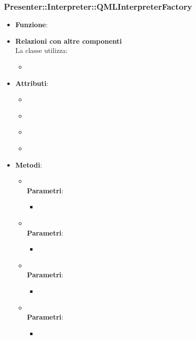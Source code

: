 \subsubsection{Presenter::Interpreter::QMLInterpreterFactory}
\begin{itemize}
\item\textbf{Funzione}:
\item\textbf{Relazioni con altre componenti}\\
La classe utilizza:
	\begin{itemize}
		\item
	\end{itemize}
\item\textbf{Attributi}:
	\begin{itemize}
		\item\code{}\\
		\item\code{}\\
		\item\code{}\\
		\item\code{}\\
	\end{itemize}
\item\textbf{Metodi}:
	\begin{itemize}
		\item\code{}\\
		\textbf{Parametri}:
			\begin{itemize}
				\item\code{}\\
			\end{itemize}
		\item\code{}\\
		\textbf{Parametri}:
			\begin{itemize}
				\item\code{}\\
			\end{itemize}
		\item\code{}\\
		\textbf{Parametri}:
			\begin{itemize}
				\item\code{}\\
			\end{itemize}
		\item\code{}\\
		\textbf{Parametri}:
			\begin{itemize}
				\item\code{}\\
			\end{itemize}
	\end{itemize}
\end{itemize}

